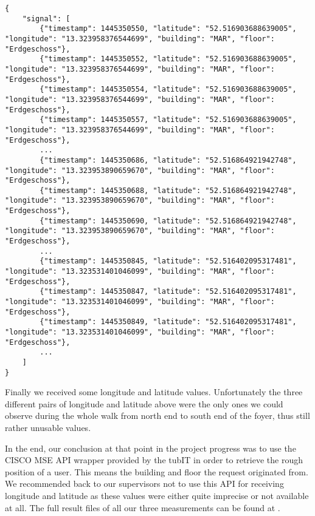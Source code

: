 \begin{lstlisting}
{
    "signal": [
        {"timestamp": 1445350550, "latitude": "52.516903688639005", "longitude": "13.323958376544699", "building": "MAR", "floor": "Erdgeschoss"},
        {"timestamp": 1445350552, "latitude": "52.516903688639005", "longitude": "13.323958376544699", "building": "MAR", "floor": "Erdgeschoss"},
        {"timestamp": 1445350554, "latitude": "52.516903688639005", "longitude": "13.323958376544699", "building": "MAR", "floor": "Erdgeschoss"},
        {"timestamp": 1445350557, "latitude": "52.516903688639005", "longitude": "13.323958376544699", "building": "MAR", "floor": "Erdgeschoss"},
        ...
        {"timestamp": 1445350686, "latitude": "52.516864921942748", "longitude": "13.323953890659670", "building": "MAR", "floor": "Erdgeschoss"},
        {"timestamp": 1445350688, "latitude": "52.516864921942748", "longitude": "13.323953890659670", "building": "MAR", "floor": "Erdgeschoss"},
        {"timestamp": 1445350690, "latitude": "52.516864921942748", "longitude": "13.323953890659670", "building": "MAR", "floor": "Erdgeschoss"},
        ...
        {"timestamp": 1445350845, "latitude": "52.516402095317481", "longitude": "13.323531401046099", "building": "MAR", "floor": "Erdgeschoss"},
        {"timestamp": 1445350847, "latitude": "52.516402095317481", "longitude": "13.323531401046099", "building": "MAR", "floor": "Erdgeschoss"},
        {"timestamp": 1445350849, "latitude": "52.516402095317481", "longitude": "13.323531401046099", "building": "MAR", "floor": "Erdgeschoss"},
        ...
    ]
}
\end{lstlisting}

Finally we received some longitude and latitude values. Unfortunately the three different pairs of longitude and latitude above were the only ones we could observe during the whole walk from north end to south end of the foyer, thus still rather unusable values.

In the end, our conclusion at that point in the project progress was to use the CISCO MSE API wrapper provided by the tubIT in order to retrieve the rough position of a user. This means the building and floor the request originated from. We recommended back to our supervisors not to use this API for receiving longitude and latitude as these values were either quite imprecise or not available at all. The full result files of all our three measurements can be found at \cite{ioslINavGitHub}.